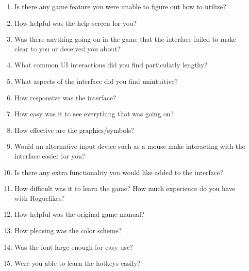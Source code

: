 \documentclass[12pt, titlepage]{article}
\begin{document}
	\begin{enumerate}
		\item Is there any game feature you were unable to figure out how to utilize?
		\item How helpful was the help screen for you?
		\item Was there anything going on in the game that the interface failed to make clear to you or deceived you about?
		\item What common UI interactions did you find particularly lengthy?
		\item What aspects of the interface did you find unintuitive?
		\item How responsive was the interface?
		\item How easy was it to see everything that was going on?
		\item How effective are the graphics/symbols?
		\item Would an alternative input device such as a mouse make interacting with the interface easier for you?
		\item Is there any extra functionality you would like added to the interface?
		\item How difficult was it to learn the game? How much experience do you have with Roguelikes?
		\item How helpful was the original game manual?
		\item How pleasing was the color scheme?
		\item Was the font large enough for easy use?
		\item Were you able to learn the hotkeys easily?
	\end{enumerate}
\end{document}
